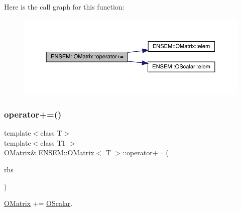 Here is the call graph for this function\+:
\nopagebreak
\begin{figure}[H]
\begin{center}
\leavevmode
\includegraphics[width=350pt]{dd/d80/classENSEM_1_1OMatrix_ab488697fd72f3891fede3d00f8deb019_cgraph}
\end{center}
\end{figure}
\mbox{\label{classENSEM_1_1OMatrix_ab488697fd72f3891fede3d00f8deb019}} 
\subsubsection{\texorpdfstring{operator+=()}{operator+=()}\hspace{0.1cm}{\footnotesize\ttfamily [6/6]}}
{\footnotesize\ttfamily template$<$class T$>$ \\
template$<$class T1 $>$ \\
\mbox{\hyperlink{classENSEM_1_1OMatrix}{O\+Matrix}}\& \mbox{\hyperlink{classENSEM_1_1OMatrix}{E\+N\+S\+E\+M\+::\+O\+Matrix}}$<$ T $>$\+::operator+= (\begin{DoxyParamCaption}\item[{const \mbox{\hyperlink{classENSEM_1_1OScalar}{O\+Scalar}}$<$ T1 $>$ \&}]{rhs }\end{DoxyParamCaption})\hspace{0.3cm}{\ttfamily [inline]}}



\mbox{\hyperlink{classENSEM_1_1OMatrix}{O\+Matrix}} += \mbox{\hyperlink{classENSEM_1_1OScalar}{O\+Scalar}}. 

